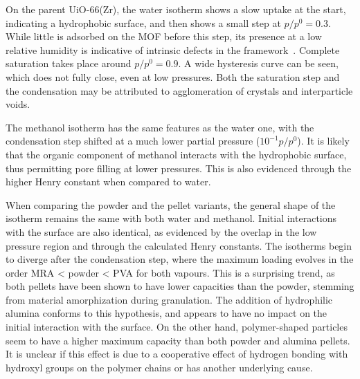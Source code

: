 On the parent UiO-66(Zr), the water isotherm shows a slow uptake 
at the start, indicating a hydrophobic surface, and then shows 
a small step at \(p/p^0 = 0.3\). While little is 
adsorbed on the MOF before this step, its presence 
at a low relative humidity is indicative of intrinsic defects
in the framework~\cite{ghoshWaterAdsorptionUiO662014}.
Complete saturation takes place around \(p/p^0 = 0.9\). 
A wide hysteresis curve can be seen, which 
does not fully close, even at low pressures. Both the
saturation step and the condensation may be attributed 
to agglomeration of crystals and interparticle voids.

The methanol isotherm has the same features as the water
one, with the condensation step shifted at a much lower 
partial pressure (\(10^{-1} p/p^0\)). It is likely that
the organic component of methanol interacts with the
hydrophobic surface, thus permitting pore filling at
lower pressures. This is also evidenced through the higher
Henry constant when compared to water.

When comparing the powder and the pellet variants, the 
general shape of the isotherm remains the same with both
water and methanol. Initial interactions with the surface are also
identical, as evidenced by the overlap in the low pressure region
and through the calculated Henry constants. The isotherms 
begin to diverge after the condensation step, where the 
maximum loading evolves in the order MRA < powder < PVA
for both vapours. This is a surprising trend, as both pellets
have been shown to have lower capacities than the powder,
stemming from material amorphization during granulation.
The addition of hydrophilic alumina conforms to this hypothesis,
and appears to have no impact on the initial interaction with 
the surface. On the other hand, polymer-shaped particles
seem to have a higher maximum capacity than both powder and 
alumina pellets. It is unclear if this effect is due to a 
cooperative effect of hydrogen bonding with hydroxyl groups 
on the polymer chains or has another underlying cause.



